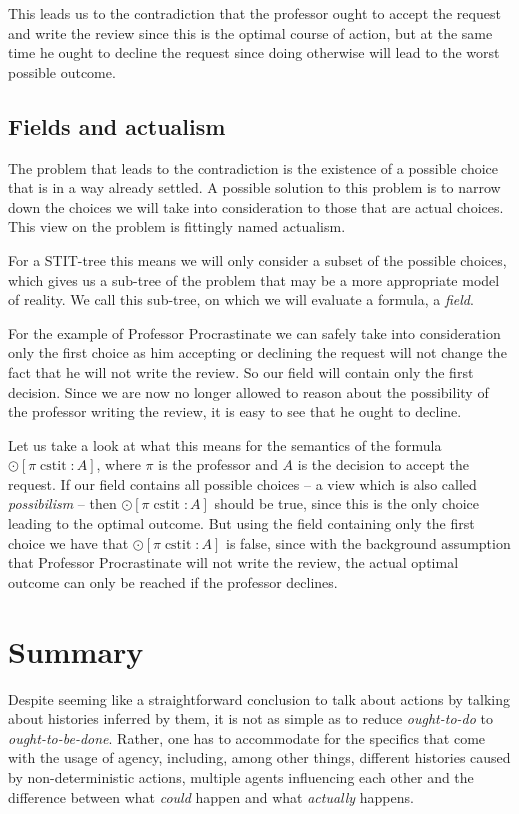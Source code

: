 \documentclass{article}
\newcommand{\cstit}{\operatorname{cstit}}
\begin{document}
This leads us to the contradiction that the professor ought to accept the request and write the review since this is the optimal course of action, but at the same time he ought to decline the request since doing otherwise will lead to the worst possible outcome.

\subsection{Fields and actualism}
The problem that leads to the contradiction is the existence of a possible choice that is in a way already settled. A possible solution to this problem is to narrow down the choices we will take into consideration to those that are actual choices. This view on the problem is fittingly named actualism.

For a STIT-tree this means we will only consider a subset of the possible choices, which gives us a sub-tree of the problem that may be a more appropriate model of reality. We call this sub-tree, on which we will evaluate a formula, a \emph{field}.

For the example of Professor Procrastinate we can safely take into consideration only the first choice as him accepting or declining the request will not change the fact that he will not write the review. So our field will contain only the first decision. Since we are now no longer allowed to reason about the possibility of the professor writing the review, it is easy to see that he ought to decline.

Let us take a look at what this means for the semantics of the formula $\odot [\pi \cstit \colon A]$, where $\pi$ is the professor and $A$ is the decision to accept the request. If our field contains all possible choices -- a view which is also called \emph{possibilism} -- then $\odot [\pi \cstit \colon A]$ should be true, since this is the only choice leading to the optimal outcome. But using the field containing only the first choice we have that $\odot [\pi \cstit \colon A]$ is false, since with the background assumption that Professor Procrastinate will not write the review, the actual optimal outcome can only be reached if the professor declines.

\section{Summary}
Despite seeming like a straightforward conclusion to talk about actions by talking about histories inferred by them, it is not as simple as to reduce \emph{ought-to-do} to \emph{ought-to-be-done}. Rather, one has to accommodate for the specifics that come with the usage of agency, including, among other things, different histories caused by non-deterministic actions, multiple agents influencing each other and the difference between what \emph{could} happen and what \emph{actually} happens.



\nocite{*}

\end{document}
